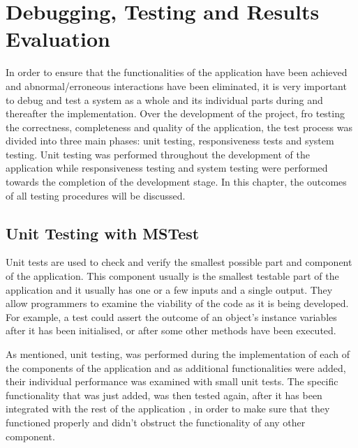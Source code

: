 \chapter{Debugging, Testing and Results Evaluation}
\label{testing}



In order to ensure that the functionalities of the application have been achieved and abnormal/erroneous interactions have been eliminated, it is very important to debug and test a system as a whole and its individual parts during and thereafter the implementation. 
Over the development of the project, fro testing the correctness, completeness and quality of the application, the test process was divided into three main phases: unit testing\cite{unit}, responsiveness tests and system testing. Unit testing was performed throughout the development of the application while responsiveness testing and system testing were performed towards the completion of the development stage. In this chapter, the outcomes of all testing procedures will be discussed.


\section{Unit Testing with MSTest}
\label{unit_testing}

Unit tests are used to check and verify the smallest  possible part and component of the application. This component usually is the smallest testable part of the application and it usually has one or a few inputs and a single output. They allow programmers to examine the viability of the code as it is being developed. For example, a test could assert the outcome of an object's instance variables after it has been initialised, or after some other methods have been executed.


As mentioned, unit testing, was performed during the implementation of each of the components of the application and as additional functionalities were added, their individual performance was examined with small unit tests. The specific functionality that was just added, was then tested again, after it has been integrated with the rest of the application , in order to make sure that they functioned properly and didn't obstruct the functionality of any other component.

